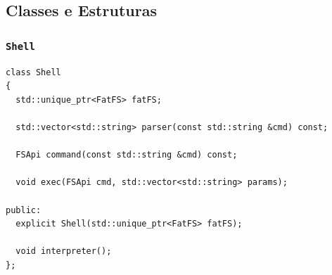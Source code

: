 \documentclass[
    12pt,				%
    oneside,   	        %
    a4paper,			%
    english,			%
    french,				%
    spanish,			%
    brazil,				%
    ]{pacotes/abntex2}
\begin{document}
\subsection{Classes e Estruturas}
\label{subsec:classes_estruturas}

\subsubsection{\texttt{Shell}}
\label{subsubsec:shell}

\begin{lstlisting}[caption={Classe que implementa o \textit{shell}}, label={lst:shell}]
class Shell
{
  std::unique_ptr<FatFS> fatFS;

  std::vector<std::string> parser(const std::string &cmd) const;

  FSApi command(const std::string &cmd) const;

  void exec(FSApi cmd, std::vector<std::string> params);

public:
  explicit Shell(std::unique_ptr<FatFS> fatFS);

  void interpreter();
};
\end{lstlisting}
\end{document}
